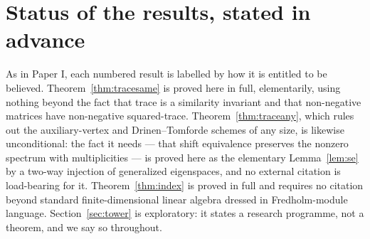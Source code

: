 \documentclass[11pt]{amsart}
\numberwithin{equation}{section}
\theoremstyle{definition}
\theoremstyle{remark}
\newcommand{\Z}{\mathbb{Z}}
\newcommand{\Jac}{\operatorname{Jac}}
\newcommand{\ind}{\operatorname{ind}}
\begin{document}
\begin{abstract}
The arithmetic is instead formalized where no positivity is required: the Hecke--Dirac
operator $\mathsf D_p$ defines an honest Fredholm module over $C(V_Y)$ with
$\ind(\mathsf D_p)=\Z\oplus\Jac(Y)$ exactly (Theorem~\ref{thm:index}), inside
$KK^0(C(V_Y),C(V_Y))\cong M_n(\Z)$. We record, rather than disguise, that for a single
finite graph this $KK$-group is nothing but a matrix ring and carries no content beyond
ordinary linear algebra; the paper closes by locating the correct venue for a genuinely
non-commutative sequel in the projective limit over a congruence tower of graphs, where
the coefficient algebra becomes an infinite, totally disconnected profinite space and
$KK^0$ ceases to be finite-dimensional. As a first exact instance of the tower
philosophy, we compute four abelian $\Z/\ell^k$ voltage towers over $K_4$ to nine levels:
the torsion obeys the Iwasawa law $\operatorname{ord}_\ell|\Jac(Y_k)|=\mu\ell^k+\lambda
k+\nu$ exactly at every computed level, with $(\mu,\lambda)=(3,1),(0,3),(2,3),(0,1)$,
positive $\mu$ occurring freely, and the Smith normal forms exhibiting $\lambda$ as the
number of persistently growing cyclic factors. The canonical combinatorial model of the
congruence tower itself --- the Iwahori path tower --- obeys instead an exact
pseudo-Iwasawa law with $\lambda=-1<0$, impossible for a $\Z_p[[T]]$-characteristic
ideal: the non-normal tower is not an Iwasawa module, and the conjecture for it is
restated over the Iwahori--Hecke algebra, with its naive commutative form withdrawn.
\end{abstract}

\maketitle

\section*{Status of the results, stated in advance}

As in Paper I, each numbered result is labelled by how it is entitled to be believed.
Theorem~\ref{thm:tracesame} is proved here in full, elementarily, using nothing beyond
the fact that trace is a similarity invariant and that non-negative matrices have
non-negative squared-trace. Theorem~\ref{thm:traceany}, which rules out the auxiliary-vertex and Drinen--Tomforde
schemes of any size, is likewise unconditional: the fact it needs --- that shift
equivalence preserves the nonzero spectrum with multiplicities --- is proved here as the
elementary Lemma~\ref{lem:se} by a two-way injection of generalized eigenspaces, and no
external citation is load-bearing for it. Theorem~\ref{thm:index} is proved in
full and requires no citation beyond standard finite-dimensional linear algebra dressed
in Fredholm-module language. Section~\ref{sec:tower} is exploratory: it states a
research programme, not a theorem, and we say so throughout.
\end{document}
